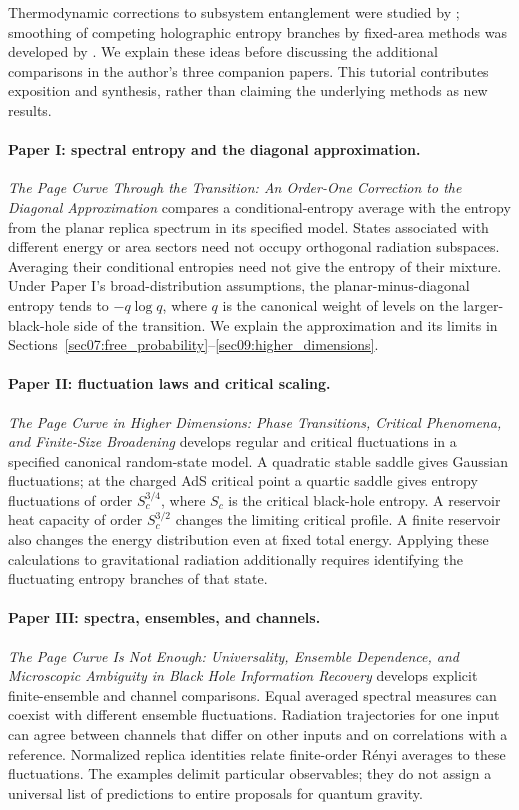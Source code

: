 \documentclass[11pt,letterpaper]{article}
\theoremstyle{plain}
\theoremstyle{definition}
\theoremstyle{remark}
\begin{document}
Thermodynamic corrections to subsystem entanglement were studied by
\citet{murthysrednicki2019}; smoothing of competing holographic entropy
branches by fixed-area methods was developed by \citet{marolfwangwang2020}.
We explain these ideas before discussing the additional comparisons in the
author's three companion papers. This tutorial contributes exposition and
synthesis, rather than claiming the underlying methods as new results.

\paragraph{Paper I: spectral entropy and the diagonal approximation.}
\emph{The Page Curve Through the Transition: An Order-One Correction to the
Diagonal Approximation} \citep{wuebben2026paper1} compares a conditional-entropy
average with the entropy from the planar replica spectrum in its specified
model. States associated with different energy or area sectors need not occupy
orthogonal radiation subspaces. Averaging their conditional entropies need not
give the entropy of their mixture. Under Paper I's broad-distribution
assumptions, the planar-minus-diagonal entropy tends to $-q\log q$, where
$q$ is the canonical weight of levels on the larger-black-hole side of the
transition. We explain the approximation and its limits
in Sections~\ref{sec07:free_probability}--\ref{sec09:higher_dimensions}.

\paragraph{Paper II: fluctuation laws and critical scaling.}
\emph{The Page Curve in Higher Dimensions: Phase Transitions, Critical
Phenomena, and Finite-Size Broadening} \citep{wuebben2026paper2} develops
regular and critical fluctuations in a specified canonical random-state
model. A quadratic stable saddle gives Gaussian fluctuations; at the charged
AdS critical point a quartic saddle gives entropy fluctuations of order
$S_c^{3/4}$, where $S_c$ is the critical black-hole entropy. A reservoir heat
capacity of order $S_c^{3/2}$ changes the limiting critical profile.
A finite reservoir also changes the energy distribution even at fixed total
energy. Applying these calculations to gravitational radiation additionally
requires identifying the fluctuating entropy branches of that state.

\paragraph{Paper III: spectra, ensembles, and channels.}
\emph{The Page Curve Is Not Enough: Universality, Ensemble Dependence, and
Microscopic Ambiguity in Black Hole Information Recovery}
\citep{wuebben2026paper3} develops explicit finite-ensemble and channel
comparisons. Equal averaged spectral measures can coexist with different
ensemble fluctuations. Radiation trajectories for one input can agree between
channels that differ on other inputs and on correlations with a reference.
Normalized replica identities relate finite-order R\'enyi averages to these
fluctuations. The examples delimit particular observables; they do not assign
a universal list of predictions to entire proposals for quantum gravity.
\end{document}
